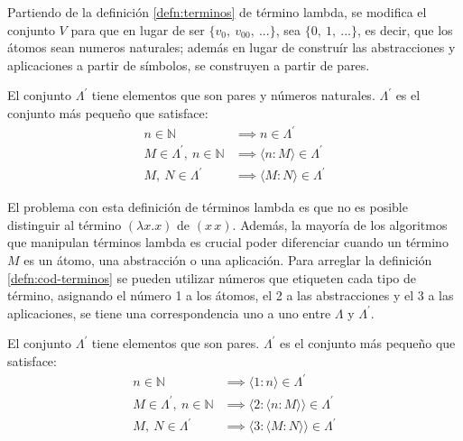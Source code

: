Partiendo de la definición \ref{defn:terminos} de término lambda, se modifica el conjunto \( V \) para que en lugar de ser \( \{v_{0},\ v_{00},\ ... \} \), sea \( \{ 0,\ 1,\ ... \} \), es decir, que los átomos sean numeros naturales; además en lugar de construír las abstracciones y aplicaciones a partir de símbolos, se construyen a partir de pares.

\begin{defn}
  El conjunto \( Λ^{\prime} \) tiene elementos que son pares y números naturales. \( Λ^{\prime} \) es el conjunto más pequeño que satisface:
  \label{defn:cod-terminos}
  \begin{subequations}
    \begin{align}
      \label{cod-terminos:atomos} \tag{a}
      n \in \mathbb{N} & \implies n \in Λ^{\prime} \\
      \label{cod-terminos:abstracciones} \tag{b}
      M \in Λ^{\prime},\ n \in \mathbb{N} & \implies  \langle n : M \rangle \in Λ^{\prime} \\
      \label{cod-terminos:aplicaciones} \tag{c}
      M,\ N \in Λ^{\prime} & \implies \langle M : N \rangle \in Λ^{\prime}
    \end{align}
  \end{subequations}
\end{defn}

El problema con esta definición de términos lambda es que no es posible distinguir al término \( (λx.x) \) de \( (x\, x) \). Además, la mayoría de los algoritmos que manipulan términos lambda es crucial poder diferenciar cuando un término \( M \) es un átomo, una abstracción o una aplicación. Para arreglar la definición \ref{defn:cod-terminos} se pueden utilizar números que etiqueten cada tipo de término, asignando el número 1 a los átomos, el 2 a las abstracciones y el 3 a las aplicaciones, se tiene una correspondencia uno a uno entre \( Λ \) y \( Λ^{\prime} \).

\begin{defn}
  El conjunto \( Λ^{\prime} \) tiene elementos que son pares. \( Λ^{\prime} \) es el conjunto más pequeño que satisface:
  \label{defn:cod-terminos2}
  \begin{subequations}
    \begin{align}
      \label{cod-terminos:atomos} \tag{a}
      n \in \mathbb{N} & \implies \langle 1 : n \rangle \in Λ^{\prime} \\
      \label{cod-terminos:abstracciones} \tag{b}
      M \in Λ^{\prime},\ n \in \mathbb{N} & \implies \langle 2 : \langle n : M \rangle \rangle \in Λ^{\prime} \\
      \label{cod-terminos:aplicaciones} \tag{c}
      M,\ N \in Λ^{\prime} & \implies \langle 3 : \langle M : N \rangle \rangle \in Λ^{\prime}
    \end{align}
  \end{subequations}
\end{defn}

